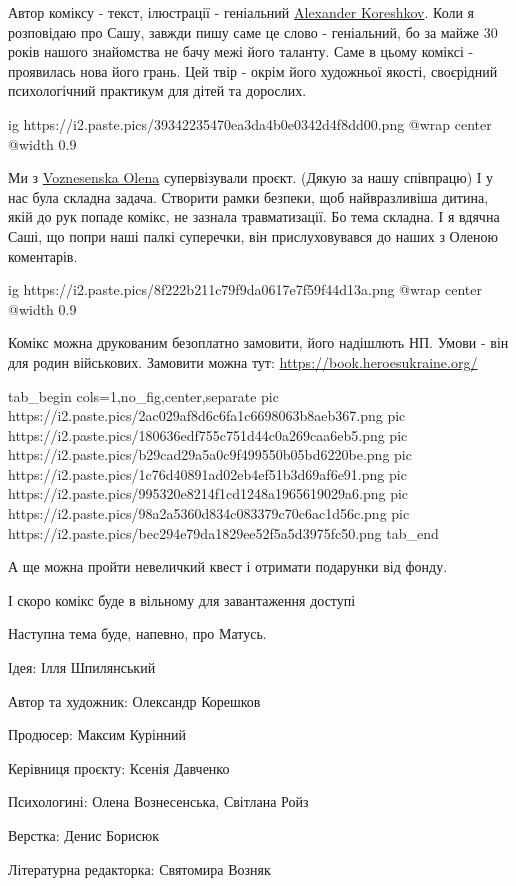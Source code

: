 Автор коміксу - текст, ілюстрації - геніальний \href{https://www.facebook.com/alexander.koreshkov.7}{Alexander Koreshkov}. Коли я
розповідаю про Сашу, завжди пишу саме це слово - геніальний, бо за майже 30
років нашого знайомства не бачу межі його таланту. Саме в цьому коміксі -
проявилась нова його грань. Цей твір - окрім його художньої якості, своєрідний
психологічний практикум для дітей та дорослих.

\ifcmt
  ig https://i2.paste.pics/39342235470ea3da4b0e0342d4f8dd00.png
  @wrap center
  @width 0.9
\fi

Ми з \href{https://www.facebook.com/voznesenska.olena}{Voznesenska Olena} супервізували проєкт. (Дякую за нашу співпрацю) І у нас
була складна задача. Створити рамки безпеки, щоб найвразливіша дитина, якій до
рук попаде комікс, не зазнала травматизації. Бо тема складна. І я вдячна Саші,
що попри наші палкі суперечки, він прислуховувався до наших з Оленою
коментарів.

\ifcmt
  ig https://i2.paste.pics/8f222b211c79f9da0617e7f59f44d13a.png
  @wrap center
  @width 0.9
\fi

Комікс можна друкованим безоплатно замовити, його надішлють НП. Умови - він для
родин військових. Замовити можна тут: \url{https://book.heroesukraine.org/}

\ifcmt
  tab_begin cols=1,no_fig,center,separate
     pic https://i2.paste.pics/2ac029af8d6c6fa1c6698063b8aeb367.png
		 pic https://i2.paste.pics/180636edf755c751d44c0a269caa6eb5.png
		 pic https://i2.paste.pics/b29cad29a5a0c9f499550b05bd6220be.png
		 pic https://i2.paste.pics/1c76d40891ad02eb4ef51b3d69af6e91.png
		 pic https://i2.paste.pics/995320e8214f1cd1248a1965619029a6.png
		 pic https://i2.paste.pics/98a2a5360d834c083379c70c6ac1d56c.png
		 pic https://i2.paste.pics/bec294e79da1829ee52f5a5d3975fc50.png
  tab_end
\fi

А ще можна пройти невеличкий квест і отримати подарунки від фонду.

І скоро комікс буде в вільному для завантаження доступі

Наступна тема буде, напевно, про Матусь.

Ідея: Ілля Шпилянський\par
Автор та художник: Олександр Корешков\par
Продюсер: Максим Курінний\par
Керівниця проєкту: Ксенія Давченко\par
Психологині: Олена Вознесенська, Світлана Ройз\par
Верстка: Денис Борисюк\par
Літературна редакторка: Святомира Возняк\par

